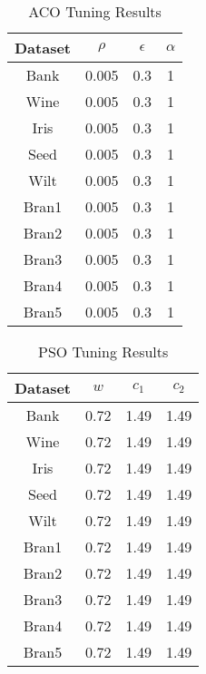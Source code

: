 \documentclass[conference]{IEEEtran}
\begin{document}
  \begin{table}[h]
  \caption{ACO Tuning Results}
  \resizebox{1.3\textwidth}{!} {\begin{minipage}{\textwidth}

      \begin{tabular}{ c |c | c | c }
        Dataset & $\rho$ & $\epsilon$ & $\alpha$ \\ \hline
        Bank & 0.005 & 0.3 & 1 \\
        Wine & 0.005 & 0.3 & 1 \\
        Iris & 0.005 & 0.3 & 1 \\
        Seed & 0.005 & 0.3 & 1 \\
        Wilt & 0.005 & 0.3 & 1 \\
        Bran1 & 0.005 & 0.3 & 1 \\
        Bran2 & 0.005 & 0.3 & 1 \\
        Bran3 & 0.005 & 0.3 & 1 \\
        Bran4 & 0.005 & 0.3 & 1 \\
        Bran5 & 0.005 & 0.3 & 1
      \end{tabular}

      \label{table:acoTuning}
  \end{minipage} }
  \end{table}
  
  \begin{table}[h]
  \caption{PSO Tuning Results}
  \resizebox{1.3\textwidth}{!} {\begin{minipage}{\textwidth}

      \begin{tabular}{ c |c | c | c }
        Dataset & $w$ & $c_1$ & $c_2$ \\ \hline
        Bank & 0.72 & 1.49 & 1.49 \\
        Wine & 0.72 & 1.49 & 1.49 \\
        Iris & 0.72 & 1.49 & 1.49 \\
        Seed & 0.72 & 1.49 & 1.49 \\
        Wilt & 0.72 & 1.49 & 1.49 \\
        Bran1 & 0.72 & 1.49 & 1.49 \\
        Bran2 & 0.72 & 1.49 & 1.49 \\
        Bran3 & 0.72 & 1.49 & 1.49 \\
        Bran4 & 0.72 & 1.49 & 1.49 \\
        Bran5 & 0.72 & 1.49 & 1.49
      \end{tabular}

      \label{table:psoTuning}
  \end{minipage} }
  \end{table}
\end{document}
